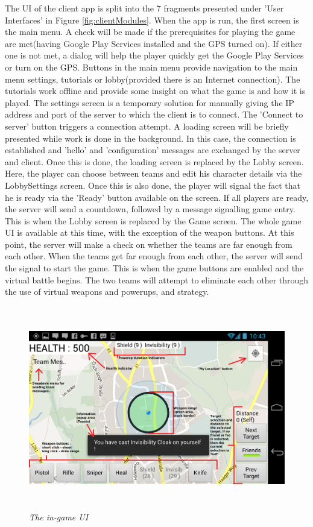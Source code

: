 The UI of the client app is split into the 7 fragments presented under 'User
Interfaces' in Figure \ref{fig:clientModules}. When the app is run, the first
screen is the main menu. A check will be made if the prerequisites for
playing the game are met(having Google Play Services installed and the
GPS turned on). If either one is not met, a dialog will help the player
quickly get the Google Play Services or turn on the GPS. Buttons in the main
menu provide navigation to the main menu settings, tutorials or lobby(provided
there is an Internet connection). The tutorials work offline and provide some
insight on what the game is and how it is played. The settings screen is a
temporary solution for manually giving the IP address and port of the server to
which the client is to connect. The 'Connect to server' button triggers a
connection attempt. A loading screen will be briefly presented while work is
done in the background. In this case, the connection is established and 'hello'
and 'configuration' messages are exchanged by the server and client. Once this
is done, the loading screen is replaced by the Lobby screen. Here, the player
can choose between teams and edit his character details via the LobbySettings
screen. Once this is also done, the player will signal the fact that he is ready
via the 'Ready' button available on the screen. If all players are ready, the
server will send a countdown, followed by a message signalling game entry. This
is when the Lobby screen is replaced by the Game screen. The whole game UI is
available at this time, with the exception of the weapon buttons. At this point,
the server will make a check on whether the teams are far enough from each
other. When the teams get far enough from each other, the server will send the
signal to start the game. This is when the game buttons are enabled and the
virtual battle begins. The two teams will attempt to eliminate each other
through the use of virtual weapons and powerups, and strategy.\newline


\begin{figure}
\includegraphics[height=3.5in,width=6.23in]{./images/android_screenshots/tutorial_game.png}  
\caption{\small \sl The in-game UI \label{fig:game_ui}}
\end{figure}



